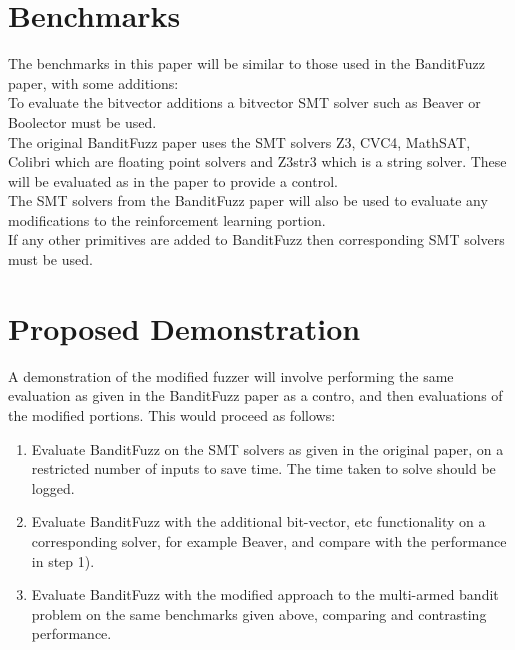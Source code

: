 \documentclass[article,11pt]{article}
\begin{document}
\section*{Benchmarks}
\label{sec:org3edba94}
The benchmarks in this paper will be similar to those used in the BanditFuzz paper, with some additions:\\
To evaluate the bitvector additions a bitvector SMT solver such as Beaver\cite{beaver} or Boolector\cite{boolector} must be used.\\
The original BanditFuzz paper\cite{bandit} uses the SMT solvers Z3, CVC4, MathSAT, Colibri which are floating point solvers and Z3str3 which is a string solver. These will be evaluated as in the paper to provide a control.\\
The SMT solvers from the BanditFuzz paper will also be used to evaluate any modifications to the reinforcement learning portion.\\
If any other primitives are added to BanditFuzz then corresponding SMT solvers must be used.\\




\section*{Proposed Demonstration}
\label{sec:org541d313}
A demonstration of the modified fuzzer will involve performing the same evaluation as given in the BanditFuzz paper\cite{bandit} as a contro, and then evaluations of the modified portions. This would proceed as follows:\\
\begin{enumerate}
\item Evaluate BanditFuzz on the SMT solvers as given in the original paper, on a restricted number of inputs to save time. The time taken to solve should be logged.\\
\item Evaluate BanditFuzz with the additional bit-vector, etc functionality on a corresponding solver, for example Beaver, and compare with the performance in step 1).\\
\item Evaluate BanditFuzz with the modified approach to the multi-armed bandit problem on the same benchmarks given above, comparing and contrasting performance.\\
\end{enumerate}
\end{document}

